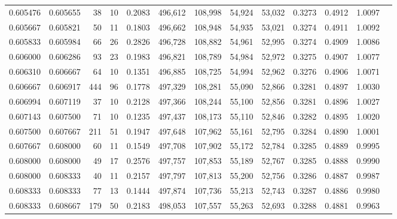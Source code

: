 \begin{tabular}{rrrrrrrrrrrrr}
0.605476 & 0.605655 &    38 &  10 &                                     0.2083 & 496,612 & 108,998 &  54,924 &  53,032 & 0.3273 & 0.4912 & 1.0097 \\
0.605667 & 0.605821 &    50 &  11 &                                     0.1803 & 496,662 & 108,948 &  54,935 &  53,021 & 0.3274 & 0.4911 & 1.0092 \\
0.605833 & 0.605984 &    66 &  26 &                                     0.2826 & 496,728 & 108,882 &  54,961 &  52,995 & 0.3274 & 0.4909 & 1.0086 \\
0.606000 & 0.606286 &    93 &  23 &                                     0.1983 & 496,821 & 108,789 &  54,984 &  52,972 & 0.3275 & 0.4907 & 1.0077 \\
0.606310 & 0.606667 &    64 &  10 &                                     0.1351 & 496,885 & 108,725 &  54,994 &  52,962 & 0.3276 & 0.4906 & 1.0071 \\
0.606667 & 0.606917 &   444 &  96 &                                     0.1778 & 497,329 & 108,281 &  55,090 &  52,866 & 0.3281 & 0.4897 & 1.0030 \\
0.606994 & 0.607119 &    37 &  10 &                                     0.2128 & 497,366 & 108,244 &  55,100 &  52,856 & 0.3281 & 0.4896 & 1.0027 \\
0.607143 & 0.607500 &    71 &  10 &                                     0.1235 & 497,437 & 108,173 &  55,110 &  52,846 & 0.3282 & 0.4895 & 1.0020 \\
0.607500 & 0.607667 &   211 &  51 &                                     0.1947 & 497,648 & 107,962 &  55,161 &  52,795 & 0.3284 & 0.4890 & 1.0001 \\
0.607667 & 0.608000 &    60 &  11 &                                     0.1549 & 497,708 & 107,902 &  55,172 &  52,784 & 0.3285 & 0.4889 & 0.9995 \\
0.608000 & 0.608000 &    49 &  17 &                                     0.2576 & 497,757 & 107,853 &  55,189 &  52,767 & 0.3285 & 0.4888 & 0.9990 \\
0.608000 & 0.608333 &    40 &  11 &                                     0.2157 & 497,797 & 107,813 &  55,200 &  52,756 & 0.3286 & 0.4887 & 0.9987 \\
0.608333 & 0.608333 &    77 &  13 &                                     0.1444 & 497,874 & 107,736 &  55,213 &  52,743 & 0.3287 & 0.4886 & 0.9980 \\
0.608333 & 0.608667 &   179 &  50 &                                     0.2183 & 498,053 & 107,557 &  55,263 &  52,693 & 0.3288 & 0.4881 & 0.9963 \\

\end{tabular}
